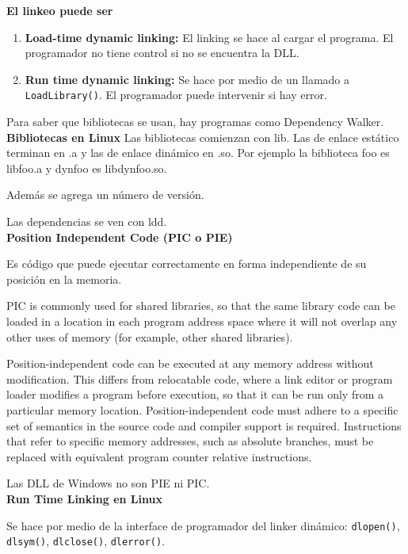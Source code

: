\documentclass[a4paper, twoside]{article}
\begin{document}
\textbf{El linkeo puede ser}
\begin{enumerate}
  \item \textbf{Load-time dynamic linking:} El linking se hace al cargar el
  programa. El programador no tiene control si no se encuentra la DLL.
  \item \textbf{Run time dynamic linking:} Se hace por medio de un llamado
  a \texttt{LoadLibrary()}. El programador puede intervenir si hay error.
\end{enumerate}

Para saber que bibliotecas se usan, hay programas como Dependency Walker.\\

\textbf{Bibliotecas en Linux}
Las bibliotecas comienzan con lib. Las de enlace estático terminan en .a y
las de enlace dinámico en .so. Por ejemplo la biblioteca foo es libfoo.a y
dynfoo es libdynfoo.so.

Además se agrega un número de versión.

Las dependencias se ven con ldd.\\

\textbf{Position Independent Code (PIC o PIE)}

Es código que puede ejecutar correctamente en forma independiente de su
posición en la memoria.

PIC is commonly used for shared libraries, so that the same library code can
be loaded in a location in each program address space where it will not overlap
any other uses of memory (for example, other shared libraries).

Position-independent code can be executed at any memory address without
modification.
This differs from relocatable code, where a link editor or program loader
modifies a program before execution, so that it can be run only from a
particular memory location.
Position-independent code must adhere to a specific set of semantics in the
source code and compiler support is required.
Instructions that refer to specific memory addresses, such as absolute
branches, must be replaced with equivalent program counter relative
instructions.

Las DLL de Windows no son PIE ni PIC.\\

\textbf{Run Time Linking en Linux}

Se hace por medio de la interface de programador del linker dinámico:
\texttt{dlopen()}, \texttt{dlsym()}, \texttt{dlclose()}, \texttt{dlerror()}.
\end{document}
